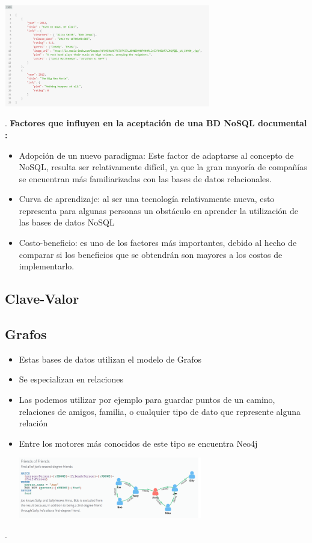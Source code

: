\documentclass[%
 reprint,
 amsmath,amssymb,
 aps,
]{revtex4-1}
\begin{document}
\begin{center}
	\includegraphics[width=9cm]{./Imagenes/documental2}
\end{center}	
.
\textbf{ Factores que influyen en la aceptación de una BD NoSQL documental :}
\begin{itemize}
		\item Adopción de un nuevo paradigma: Este factor de adaptarse al concepto de NoSQL, resulta ser relativamente difícil, ya que la gran mayoría de compañías se encuentran más familiarizadas con las bases de datos relacionales.
		\item Curva de aprendizaje: al ser una tecnología relativamente nueva, esto representa para algunas personas un obstáculo en aprender la utilización de las bases de datos NoSQL
		\item Costo-beneficio: es uno de los factores más importantes, debido al hecho de comparar si los beneficios que se obtendrán son mayores a los costos de implementarlo.                     
\end{itemize}
\subsection{Clave-Valor}


\subsection{Grafos}
\begin{itemize}
		\item Estas bases de datos utilizan el modelo de Grafos
		\item Se especializan en relaciones
		\item Las podemos utilizar por ejemplo para guardar puntos de un camino, relaciones de amigos, familia, o cualquier tipo de  dato que represente alguna relación
                     \item Entre los motores más conocidos de este tipo se encuentra Neo4j
                     \begin{center}
		\includegraphics[width=8cm]{./Imagenes/4}
		\end{center}	
	          \end{itemize}
.
\end{document}
